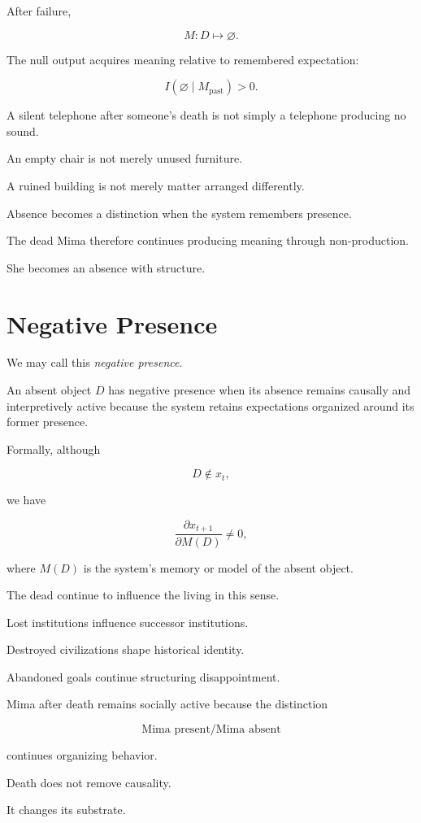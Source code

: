 \documentclass[11pt,oneside]{book}
\theoremstyle{definition}
\theoremstyle{remark}
\begin{document}
After failure,

\[
M:D\mapsto\varnothing.
\]

The null output acquires meaning relative to remembered expectation:

\[
I(\varnothing\mid M_{\mathrm{past}})>0.
\]

A silent telephone after someone's death is not simply a telephone producing no sound.

An empty chair is not merely unused furniture.

A ruined building is not merely matter arranged differently.

Absence becomes a distinction when the system remembers presence.

The dead Mima therefore continues producing meaning through non-production.

She becomes an absence with structure.

\section{Negative Presence}

We may call this \emph{negative presence}.

An absent object \(D\) has negative presence when its absence remains causally and interpretively active because the system retains expectations organized around its former presence.

Formally, although

\[
D\notin x_t,
\]

we have

\[
\frac{\partial x_{t+1}}
{\partial M(D)}
\neq0,
\]

where \(M(D)\) is the system's memory or model of the absent object.

The dead continue to influence the living in this sense.

Lost institutions influence successor institutions.

Destroyed civilizations shape historical identity.

Abandoned goals continue structuring disappointment.

Mima after death remains socially active because the distinction

\[
\text{Mima present}/\text{Mima absent}
\]

continues organizing behavior.

Death does not remove causality.

It changes its substrate.
\end{document}
